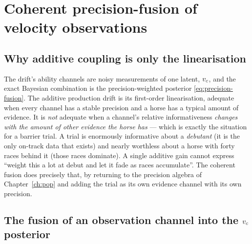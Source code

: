 \chapter{Coherent precision-fusion of velocity observations}
\label{ch:fusion}

\section{Why additive coupling is only the linearisation}

The drift's ability channels are noisy measurements of one latent, ${v_{c}}$, and the exact Bayesian
combination is the precision-weighted posterior \eqref{eq:precision-fusion}. The additive
production drift is its first-order linearisation, adequate when every channel has a stable
precision and a horse has a typical amount of evidence. It is \emph{not} adequate when a channel's
relative informativeness \emph{changes with the amount of other evidence the horse has} --- which
is exactly the situation for a barrier trial. A trial is enormously informative about a
\emph{debutant} (it is the only on-track data that exists) and nearly worthless about a horse with
forty races behind it (those races dominate). A single additive gain cannot express ``weight this
a lot at debut and let it fade as races accumulate''. The coherent fusion does precisely that, by
returning to the precision algebra of Chapter~\ref{ch:pop} and adding the trial as its own
evidence channel with its own precision.

\section{The fusion of an observation channel into the ${v_{c}}$ posterior}

